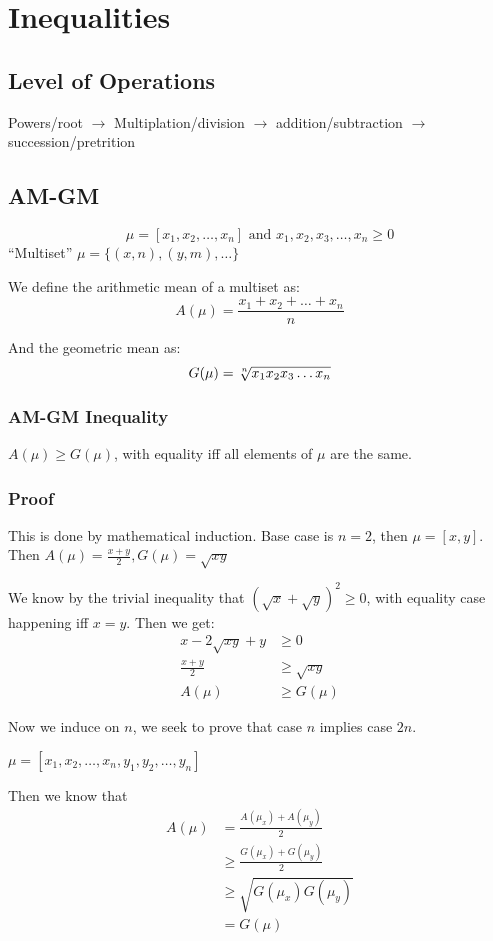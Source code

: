 \section{Inequalities}
\subsection{Level of Operations}
Powers/root $\to$ Multiplation/division $\to$ addition/subtraction $\to$
succession/pretrition
\subsection{AM-GM}

$$\mu = [x_1, x_2, \dots, x_n] \text{ and } x_1, x_2, x_3, \dots, x_n \geq 0$$
``Multiset'' $\mu = \{(x, n), (y, m), \dots\}$

We define the arithmetic mean of a multiset as:
$$A(\mu) = \frac{x_1 + x_2 + \dots + x_n}{n}$$

And the geometric mean as:
$$G(\mu) = \sqrt[\uproot{2}n]{x_1x_2x_3\dots x_n}$$

\subsubsection{AM-GM Inequality}
$A(\mu) \geq G(\mu)$, with equality iff all elements
of $\mu$ are the same.

\subsubsection{Proof}
This is done by mathematical induction. Base case is $n = 2$, then $\mu = [x,
y]$. Then $A(\mu) = \frac{x + y}{2}, G(\mu) = \sqrt{xy}$

We know by the trivial inequality that $(\sqrt{x} + \sqrt{y})^2 \geq 0$, with
equality case happening iff $x = y$. Then we get:
\begin{align*}
    x - 2 \sqrt{xy} + y &\geq 0\\
        \frac{x + y}{2} &\geq \sqrt{xy}\\
                 A(\mu) &\geq G(\mu)
\end{align*}

Now we induce on $n$, we seek to prove that case $n$ implies case $2n$.

$\mu = [x_1, x_2, \dots, x_n, y_1, y_2, \dots, y_n]$

Then we know that
\begin{align*}
    A(\mu) &= \frac{A(\mu_x) + A(\mu_y)}{2}\\
           &\geq \frac{G(\mu_x) + G(\mu_y)}{2}\\
           &\geq \sqrt{G(\mu_x)G(\mu_y)}\\
           &= G(\mu)
\end{align*}

